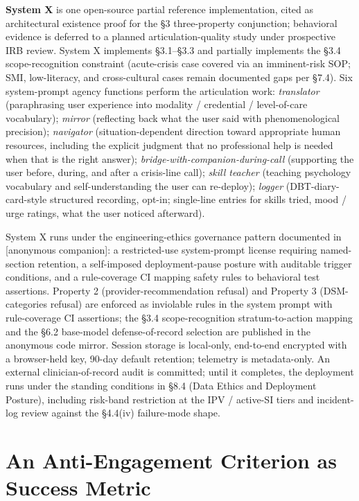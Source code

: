 \documentclass[letterpaper]{article}
\begin{document}
\textbf{System X} is one open-source partial reference implementation, cited as architectural existence proof for the \S3 three-property conjunction; behavioral evidence is deferred to a planned articulation-quality study under prospective IRB review. System X implements \S3.1--\S3.3 and partially implements the \S3.4 scope-recognition constraint (acute-crisis case covered via an imminent-risk SOP; SMI, low-literacy, and cross-cultural cases remain documented gaps per \S7.4). Six system-prompt agency functions perform the articulation work: \emph{translator} (paraphrasing user experience into modality / credential / level-of-care vocabulary); \emph{mirror} (reflecting back what the user said with phenomenological precision); \emph{navigator} (situation-dependent direction toward appropriate human resources, including the explicit judgment that no professional help is needed when that is the right answer); \emph{bridge-with-companion-during-call} (supporting the user before, during, and after a crisis-line call); \emph{skill teacher} (teaching psychology vocabulary and self-understanding the user can re-deploy); \emph{logger} (DBT-diary-card-style structured recording, opt-in; single-line entries for skills tried, mood / urge ratings, what the user noticed afterward).

System X runs under the engineering-ethics governance pattern documented in {[}anonymous companion{]}: a restricted-use system-prompt license requiring named-section retention, a self-imposed deployment-pause posture with auditable trigger conditions, and a rule-coverage CI mapping safety rules to behavioral test assertions. Property 2 (provider-recommendation refusal) and Property 3 (DSM-categories refusal) are enforced as inviolable rules in the system prompt with rule-coverage CI assertions; the \S3.4 scope-recognition stratum-to-action mapping and the \S6.2 base-model defense-of-record selection are published in the anonymous code mirror. Session storage is local-only, end-to-end encrypted with a browser-held key, 90-day default retention; telemetry is metadata-only. An external clinician-of-record audit is committed; until it completes, the deployment runs under the standing conditions in \S8.4 (Data Ethics and Deployment Posture), including risk-band restriction at the IPV / active-SI tiers and incident-log review against the \S4.4(iv) failure-mode shape.

\section{An Anti-Engagement Criterion as Success Metric}
\end{document}
